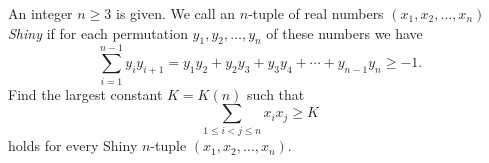 An integer $n \geq 3$ is given. We call an $n$-tuple of real numbers $(x_1, x_2, \ldots, x_n)$ \emph{Shiny} if for each permutation $y_1, y_2, \ldots, y_n$ of these numbers we have
\[
\sum_{i=1}^{n-1} y_i y_{i+1} = y_1 y_2 + y_2 y_3 + y_3 y_4 + \cdots + y_{n-1} y_n \geq -1.
\]
Find the largest constant $K = K(n)$ such that
\[
\sum_{1 \leq i < j \leq n} x_i x_j \geq K
\]
holds for every Shiny $n$-tuple $(x_1, x_2, \ldots, x_n)$.
